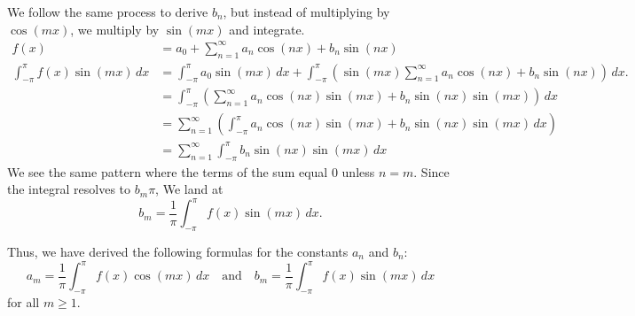 \begin{problem}
    We follow the same process to derive $b_n$, but instead of multiplying by $\cos(mx)$, we multiply by $\sin(mx)$ and integrate.
    \begin{align*}
        f(x) &= a_0 + \sum_{n=1}^{\infty} a_n \cos(nx) + b_n \sin(nx) \\
        \int_{-\pi}^{\pi} f(x) \sin(mx) \, dx &= \int_{-\pi}^{\pi} a_0 \sin(mx) \, dx + \int_{-\pi}^{\pi} \left( \sin(mx) \sum_{n=1}^{\infty} a_n \cos(nx) + b_n \sin(nx) \right) \, dx. \\
         &= \int_{-\pi}^{\pi} \left( \sum_{n=1}^{\infty} a_n \cos(nx) \sin(mx) + b_n \sin(nx) \sin(mx) \right) \, dx \\
         &= \sum_{n=1}^{\infty} \left( \int_{-\pi}^{\pi} a_n \cos(nx) \sin(mx) + b_n \sin(nx) \sin(mx) \, dx \right) \\
         &= \sum_{n=1}^{\infty} \int_{-\pi}^{\pi} b_n \sin(nx) \sin(mx) \, dx
    \end{align*}
    We see the same pattern where the terms of the sum equal 0 unless $n=m$. Since the integral resolves to $b_m\pi$, We land at
    \begin{equation}
        b_m = \frac{1}{\pi} \int_{-\pi}^{\pi} f(x) \sin(mx) \, dx.
    \end{equation}

    Thus, we have derived the following formulas for the constants $a_n$ and $b_n$:
    \begin{equation}
        a_m = \frac{1}{\pi} \int_{-\pi}^{\pi} f(x) \cos(mx) \, dx 
        \quad \text{and} \quad 
        b_m = \frac{1}{\pi} \int_{-\pi}^{\pi} f(x) \sin(mx) \, dx
    \end{equation}
    for all $m \geq 1$.
\end{problem}